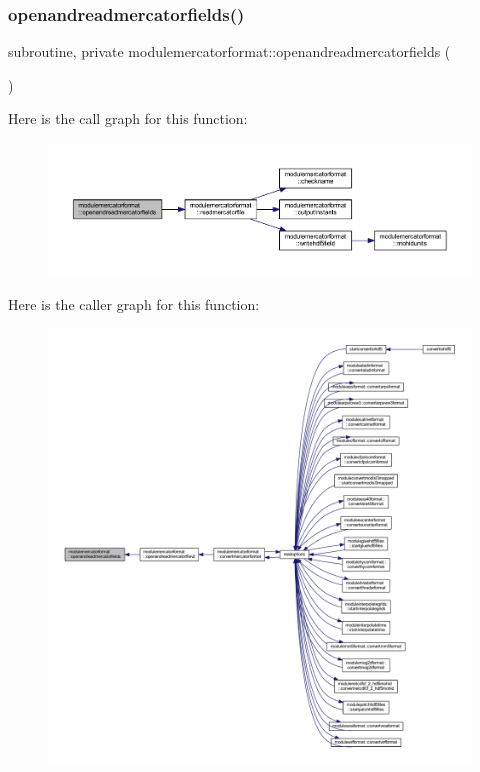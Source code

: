 \subsubsection{\texorpdfstring{openandreadmercatorfields()}{openandreadmercatorfields()}}
{\footnotesize\ttfamily subroutine, private modulemercatorformat\+::openandreadmercatorfields (\begin{DoxyParamCaption}{ }\end{DoxyParamCaption})\hspace{0.3cm}{\ttfamily [private]}}

Here is the call graph for this function\+:\nopagebreak
\begin{figure}[H]
\begin{center}
\leavevmode
\includegraphics[width=350pt]{namespacemodulemercatorformat_a2c5e1b6294e73cf15d0617776b56408c_cgraph}
\end{center}
\end{figure}
Here is the caller graph for this function\+:\nopagebreak
\begin{figure}[H]
\begin{center}
\leavevmode
\includegraphics[width=350pt]{namespacemodulemercatorformat_a2c5e1b6294e73cf15d0617776b56408c_icgraph}
\end{center}
\end{figure}
\mbox{\label{namespacemodulemercatorformat_a37b4ad910fc8c1eca130c7b29a79d828}} 
